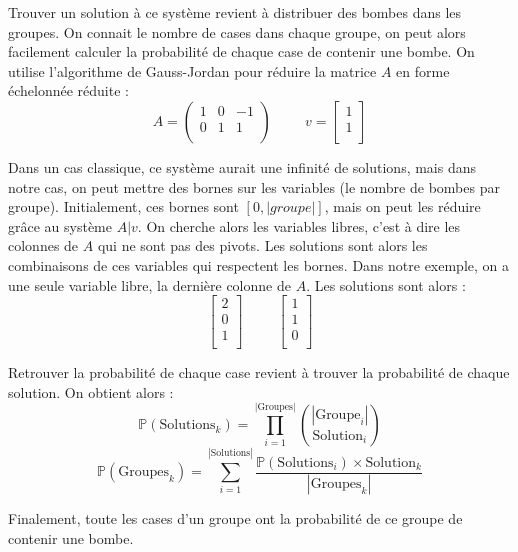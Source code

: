 Trouver un solution à ce système revient à distribuer des bombes dans les groupes. On connait le nombre de cases dans chaque groupe, on peut alors facilement calculer la probabilité de chaque case de contenir une bombe.
\newline
\newline
On utilise l'algorithme de Gauss-Jordan pour réduire la matrice $A$ en forme échelonnée réduite :
\[
    A = \begin{pmatrix}
        1 & 0 & -1 \\
        0 & 1 & 1 \\
    \end{pmatrix}
    \hspace{1cm}
    v = \begin{bmatrix} 1 \\1 \\ \end{bmatrix}
\]

Dans un cas classique, ce système aurait une infinité de solutions, mais dans notre cas, on peut mettre des bornes sur les variables (le nombre de bombes par groupe).
Initialement, ces bornes sont $[0, |groupe|]$, mais on peut les réduire grâce au système $A|v$.
\newline
On cherche alors les variables libres, c'est à dire les colonnes de $A$ qui ne sont pas des pivots. Les solutions sont alors les combinaisons de ces variables qui respectent les bornes.
\newpage
Dans notre exemple, on a une seule variable libre, la dernière colonne de $A$. Les solutions sont alors :
\[
    \begin{bmatrix} 2 \\0 \\1 \\ \end{bmatrix}
    \hspace{1cm}
    \begin{bmatrix} 1 \\1 \\0 \\ \end{bmatrix}
\]

Retrouver la probabilité de chaque case revient à trouver la probabilité de chaque solution. On obtient alors :
\[
    \mathbb{P}(\text{Solutions}_k) = \prod_{i=1}^{|\text{Groupes}|} \binom{|\text{Groupe}_i|}{\text{Solution}_i}
\]
\[
    \mathbb{P}(\text{Groupes}_k) = \sum_{i=1}^{|\text{Solutions}|} \frac{\mathbb{P}(\text{Solutions}_i) \times \text{Solution}_k}{|\text{Groupes}_k|}
\]

Finalement, toute les cases d'un groupe ont la probabilité de ce groupe de contenir une bombe.
